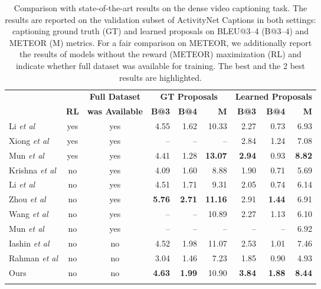 \documentclass{src/bmvc2k}
\def\etal{\emph{et al}\bmvaOneDot}
\begin{document}
\begin{table}
\small
\centering
\clearpage{}\begin{tabular}{lcc rrr rrr}
\toprule
& & \textbf{Full Dataset} & \multicolumn{3}{c}{ \textbf{GT Proposals} } & \multicolumn{3}{c}{ \textbf{Learned Proposals} } \\
& \textbf{RL} & \textbf{was Available} & \textbf{B@3} & \textbf{B@4} & \textbf{M} & \textbf{B@3} & \textbf{B@4} & \textbf{M} \\
\midrule
Li \etal \cite{Li2018} & yes & yes & 4.55 & 1.62 & 10.33 & 2.27 & 0.73 & 6.93 \\
Xiong \etal \cite{MFT_Xiong2018} & yes & yes & -- & -- & -- & 2.84 & 1.24 & 7.08 \\
Mun \etal \cite{Streamlined_Mun2019} & yes & yes & 4.41 & 1.28 & \textbf{13.07} & \textbf{2.94} & 0.93 & \textbf{8.82} \\
\midrule
Krishna \etal \cite{Krishna2017} & no & yes & 4.09 & 1.60 & 8.88 & 1.90 & 0.71 & 5.69 \\
Li \etal \cite{Li2018} & no & yes & 4.51 & 1.71 & 9.31 & 2.05 & 0.74 & 6.14 \\
Zhou \etal \cite{masked_transformer_Zhou2018} & no & yes & \textbf{5.76} & \textbf{2.71} & \textbf{11.16} & 2.91 & \textbf{1.44} & 6.91 \\
Wang \etal \cite{bafcg_Wang2018n} & no & yes & -- & -- & 10.89 & 2.27 & 1.13 & 6.10 \\
Mun \etal \cite{Streamlined_Mun2019} & no & yes & -- & -- & -- & -- & -- & 6.92 \\
\midrule
Iashin \etal \cite{mdvc_Iashin_2020} & no & no & 4.52 & 1.98 & 11.07 & 2.53 & 1.01 & 7.46 \\
Rahman \etal \cite{Rahman2019} & no & no & 3.04 & 1.46 & 7.23 & 1.85 & 0.90 & 4.93 \\
Ours & no & no & \textbf{4.63} & \textbf{1.99} & 10.90 & \textbf{3.84} &\textbf{ 1.88} &\textbf{ 8.44} \\
\bottomrule
\vspace{0ex}
\end{tabular}
\clearpage{}
\caption{Comparison with state-of-the-art results on the dense video captioning task. The results are reported on the validation subset of ActivityNet Captions in both settings: captioning ground truth (GT) and learned proposals on BLEU@3--4 (B@3--4) and METEOR (M) metrics. For a fair comparison on METEOR, we additionally report the results of models without the reward (METEOR) maximization (RL) and indicate whether full dataset was available for training. The best and the 2 best results are highlighted. \label{tab:dense_cap_results}}
\end{table}
\end{document}
